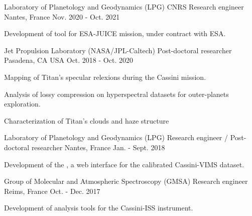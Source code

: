 
\begin{cventries}

  \cventry
  {Laboratory of Planetology and Geodynamics (LPG)}
  {CNRS Research engineer}
  {Nantes, France}
  {Nov. 2020 - Oct. 2021}
  {
    \begin{cvitems}
      \item{Development of  tool for ESA‑JUICE mission, under contract with ESA.}
    \end{cvitems}
    \vspace{1em}
  }

  \cventry
    {Jet Propulsion Laboratory (NASA/JPL-Caltech)}
    {Post-doctoral researcher}
    {Pasadena, CA USA}
    {Oct. 2018 - Oct. 2020}
    {
      \begin{cvitems}
        \item{Mapping of Titan's specular relexions during the Cassini mission.}
        \item{Analysis of lossy compression on hyperspectral datasets for outer-planets exploration.}
        \item{Characterization of Titan's clouds and haze structure}
      \end{cvitems}
      \vspace{1em}
    }

  \cventry
    {Laboratory of Planetology and Geodynamics (LPG)}
    {Research engineer / Post-doctoral researcher}
    {Nantes, France}
    {Jan. - Sept. 2018}
    {
      \begin{cvitems}
        \item{Development of the
        ,
        a web interface for the calibrated Cassini-VIMS dataset.}
      \end{cvitems}
      \vspace{1em}
    }

  \cventry
    {Group of Molecular and Atmospheric Spectroscopy (GMSA)}
    {Research engineer}
    {Reims, France}
    {Oct. - Dec. 2017}
    {
      \begin{cvitems}
        \item{Development of analysis tools for the Cassini-ISS instrument.}
      \end{cvitems}
      \vspace{1em}
    }

\end{cventries}
